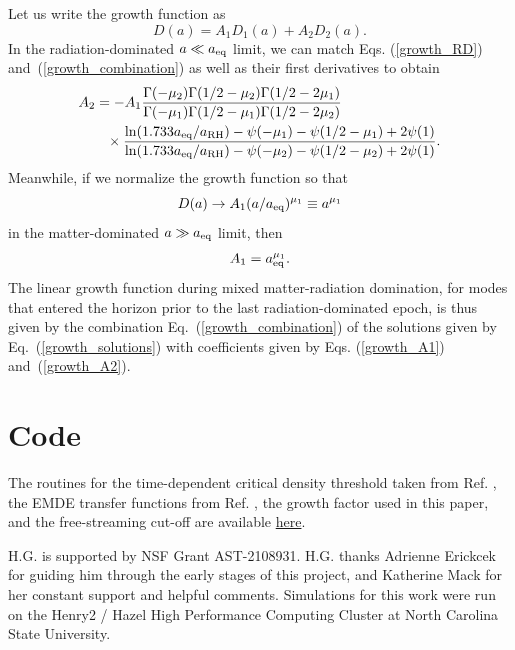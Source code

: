 \documentclass[a4paper,11pt]{article}
\newcommand{\rh}[1]{{#1}_{\mathrm{RH}}}
\newcommand{\aeq}{a_{\rm eq}}
\begin{document}
Let us write the growth function as
\begin{equation}\label{growth_combination}
D(a)=A_1 D_1(a)+A_2 D_2(a).
\end{equation}
In the radiation-dominated $a\ll\aeq$ limit, we can match Eqs. (\ref{growth_RD}) and~(\ref{growth_combination}) as well as their first derivatives to obtain
\begin{align}\label{growth_A2}
A_2&=
-A_1
\frac
{\Gamma(-\mu_2)\Gamma(1/2-\mu_2)\Gamma(1/2-2 \mu_1)}
{\Gamma(-\mu_1)\Gamma(1/2-\mu_1)\Gamma (1/2-2\mu_2)}
\nonumber\\&\hphantom{=}\times
\frac
{\ln(1.733 \aeq/\rh{a})-\psi(-\mu_1)-\psi(1/2-\mu_1)+2\psi(1)}
{\ln(1.733 \aeq/\rh{a})-\psi(-\mu_2)-\psi(1/2-\mu_2)+2\psi(1)}.
\end{align}
Meanwhile, if we normalize the growth function so that
\begin{equation}
D(a)\to A_1 (a/\aeq)^{\mu_1}\equiv a^{\mu_1}
\end{equation}
in the matter-dominated $a\gg\aeq$ limit, then
\begin{equation}\label{growth_A1}
A_1=\aeq^{\mu_1}.
\end{equation}
The linear growth function during mixed matter-radiation domination, for modes that entered the horizon prior to the last radiation-dominated epoch, is thus given by the combination Eq.~(\ref{growth_combination}) of the solutions given by Eq.~(\ref{growth_solutions}) with coefficients given by Eqs. (\ref{growth_A1}) and~(\ref{growth_A2}).

\section{Code}

The routines for the time-dependent critical density threshold taken from Ref. \cite{blanco19}, the EMDE transfer functions from Ref. \cite{hg23}, the growth factor used in this paper, and the free-streaming cut-off are available \href{https://github.com/hganjoo/emde_heating}{here}.

\acknowledgments

H.G. is supported by NSF Grant AST-2108931. H.G. thanks Adrienne Erickcek for guiding him through the early stages of this project, and Katherine Mack for her constant support and helpful comments. Simulations for this work were run on the Henry2 / Hazel High Performance Computing Cluster at North Carolina State University. 

\appendix



%
\end{document}
